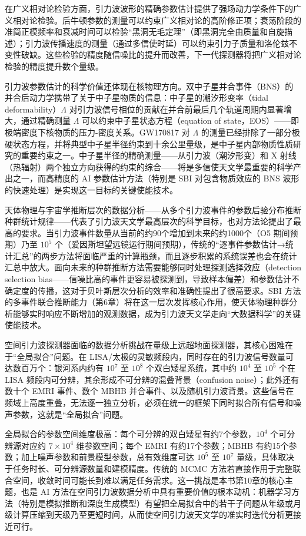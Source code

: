 在广义相对论检验方面，引力波波形的精确参数估计提供了强场动力学条件下的广义相对论检验。后牛顿参数的测量可以约束广义相对论的高阶修正项；衰荡阶段的准简正模频率和衰减时间可以检验“黑洞无毛定理”（即黑洞完全由质量和自旋描述）；引力波传播速度的测量（通过多信使时延）可以约束引力子质量和洛伦兹不变性破缺。这些检验的精度随信噪比的提升而改善，下一代探测器将把广义相对论检验的精度提升数个量级。

引力波参数估计的科学价值还体现在核物理方向。双中子星并合事件（BNS）的并合后动力学携带了关于中子星物质的信息：中子星的潮汐形变率（tidal deformability）$\Lambda$ 对引力波信号相位的贡献在并合前最后几个轨道周期内显著增大，通过精确测量 $\Lambda$ 可以约束中子星状态方程（equation of state，EOS）——即极端密度下核物质的压力-密度关系。GW170817 对 $\Lambda$ 的测量已经排除了一部分极硬状态方程，并将典型中子星半径约束到十余公里量级，是中子星内部物质性质研究的重要约束之一。中子星半径的精确测量——从引力波（潮汐形变）和 X 射线（热辐射）两个独立方向获得的约束的综合——将是多信使天文学最重要的科学产出之一，而高精度的 AI 参数估计方法（特别是 SBI 对包含物质效应的 BNS 波形的快速处理）是实现这一目标的关键使能技术。

天体物理与宇宙学推断层次的数据分析——从多个引力波事件的参数后验分布推断种群统计规律——代表了引力波天文学最高层次的科学目标，也对方法论提出了最高的要求。当引力波事件数量从当前的约90个增加到未来的约1000个（O5 期间预期）乃至 $10^5$ 个（爱因斯坦望远镜运行期间预期），传统的“逐事件参数估计→统计汇总”的两步方法将面临严重的计算瓶颈，而且逐步积累的系统误差也会在统计汇总中放大。面向未来的种群推断方法需要能够同时处理探测选择效应（detection selection bias——信噪比高的事件更容易被探测到，导致样本偏差）和参数估计不确定度的传播，这对于贝叶斯层次分析的效率和准确性提出了很高要求。SBI 方法的多事件联合推断能力（第6章）将在这一层次发挥核心作用，使天体物理种群分析能够实时响应不断增加的观测数据，成为引力波天文学走向“大数据科学”的关键使能技术。

空间引力波探测器面临的数据分析挑战在量级上远超地面探测器，其核心困难在于“全局拟合”问题。在 LISA/太极的灵敏频段内，同时存在的引力波信号数量可达数百万个：银河系内约有 $10^7$ 至 $10^8$ 个双白矮星系统，其中约 $10^4$ 至 $10^5$ 个在 LISA 频段内可分辨，其余形成不可分辨的混叠背景（confusion noise）；此外还有数十个 EMRI 事件、数个 MBHB 并合事件、以及随机引力波背景。这些信号在频域上高度重叠，无法逐一独立分析，必须在统一的框架下同时拟合所有信号和噪声参数，这就是“全局拟合”问题。

全局拟合的参数空间维度极高：每个可分辨的双白矮星有约7个参数，$10^4$ 个可分辨源对应约 $7\times10^4$ 维参数空间；每个 EMRI 有约17个参数；MBHB 有约15个参数；加上噪声参数和前景模型参数，总有效维度可达 $10^5$ 至 $10^7$ 量级，具体取决于任务时长、可分辨源数量和建模精度。传统的 MCMC 方法若直接作用于完整联合空间，收敛时间可能长到难以满足任务需求。这一挑战是本书第10章的核心主题，也是 AI 方法在空间引力波数据分析中具有重要价值的根本动机：机器学习方法（特别是模拟推断和深度生成模型）有望把全局拟合中的若干子问题从年级或月级计算压缩到天级乃至更短时间，从而使空间引力波天文学的准实时迭代分析更接近可行。

